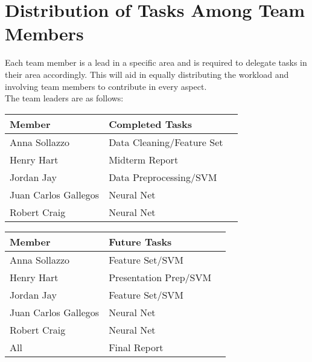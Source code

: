 \documentclass[journal]{IEEEtran}
\begin{document}

\section{Distribution of Tasks Among Team Members}

Each team member is a lead in a specific area and is required to delegate tasks in their area accordingly. This will aid in equally distributing the workload and involving team members to contribute in every aspect.\\ 

The team leaders are as follows:

\begin{table}[h!]
    \label{tab:table1}
    \begin{tabular}{l|l|l|}
      \textbf{Member} & \textbf{Completed Tasks}\\

      \hline
	Anna Sollazzo & Data Cleaning/Feature Set\\
	Henry Hart & Midterm Report\\
	Jordan Jay & Data Preprocessing/SVM\\
	Juan Carlos Gallegos & Neural Net\\
	Robert Craig & Neural Net\\

    \end{tabular}
\end{table}

\begin{table}[h!]
    \label{tab:table1}
    \begin{tabular}{l|l|l|}
      \textbf{Member} & \textbf{Future Tasks}\\

      \hline
	Anna Sollazzo & Feature Set/SVM\\
	Henry Hart & Presentation Prep/SVM\\
	Jordan Jay & Feature Set/SVM\\
	Juan Carlos Gallegos & Neural Net\\
	Robert Craig & Neural Net\\
	All & Final Report

    \end{tabular}
\end{table}

\end{document}
